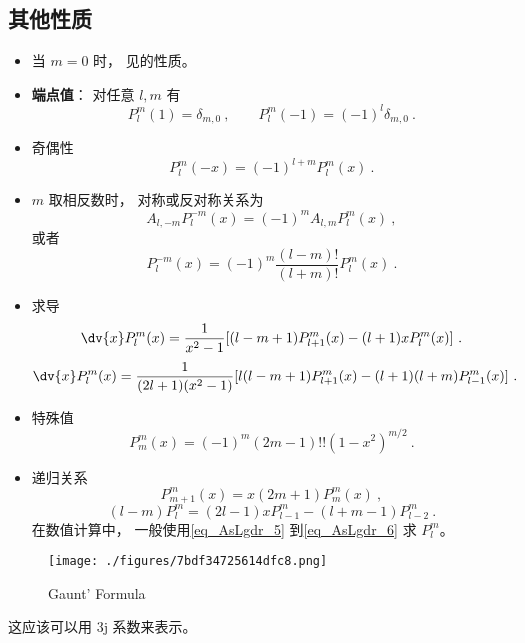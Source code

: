 \subsection{其他性质}
\begin{itemize}
\item 当 $m = 0$ 时， 见的性质。

\item \textbf{端点值}： 对任意 $l, m$ 有
\begin{equation}\label{eq_AsLgdr_2}
P_l^m(1) = \delta_{m, 0}~,
\qquad
P_l^m(-1) = (-1)^l \delta_{m, 0}~.
\end{equation}
\item 奇偶性
\begin{equation}
P_l^m(-x) = (-1)^{l+m}P_l^m(x)~.
\end{equation}
\item $m$ 取相反数时， 对称或反对称关系为
\begin{equation}
A_{l,-m} P_l^{-m}(x) = (-1)^m A_{l,m} P_l^m(x)~,
\end{equation}
或者
\begin{equation}
P_l^{-m}(x) = (-1)^m \frac{(l-m)!}{(l+m)!} P_l^m(x)~.
\end{equation}
\item 求导
\begin{equation}\label{eq_AsLgdr_7} %
\dv{x} P_l^m(x) = \frac{1}{x^2-1} [(l-m+1)P_{l+1}^m(x) - (l+1)xP_l^m(x)]~.
\end{equation}
\begin{equation}\label{eq_AsLgdr_8} %
\dv{x} P_l^m(x) = \frac{1}{(2l+1)(x^2-1)} [l(l-m+1)P_{l+1}^m(x) - (l+1)(l+m)P_{l-1}^m(x)]~.
\end{equation}
\item 特殊值
\begin{equation}\label{eq_AsLgdr_5} %
P_m^m(x) = (-1)^m (2m-1)!! (1-x^2)^{m/2}~.
\end{equation}
\item 递归关系
\begin{equation} %
P_{m+1}^m(x) = x (2m + 1) P_m^m(x)~,
\end{equation}
\begin{equation}\label{eq_AsLgdr_6} %
(l-m) P_l^m = (2l-1) x P_{l-1}^m - (l+m-1) P_{l-2}^m~.
\end{equation}
在数值计算中， 一般使用\autoref{eq_AsLgdr_5} 到\autoref{eq_AsLgdr_6} 求 $P_l^m$。
\end{itemize}


\begin{figure}[ht]
\centering
\texttt{[image: ./figures/7bdf34725614dfc8.png]}
\caption{Gaunt' Formula} \label{fig_AsLgdr_1}
\end{figure}
这应该可以用 3j 系数来表示。
